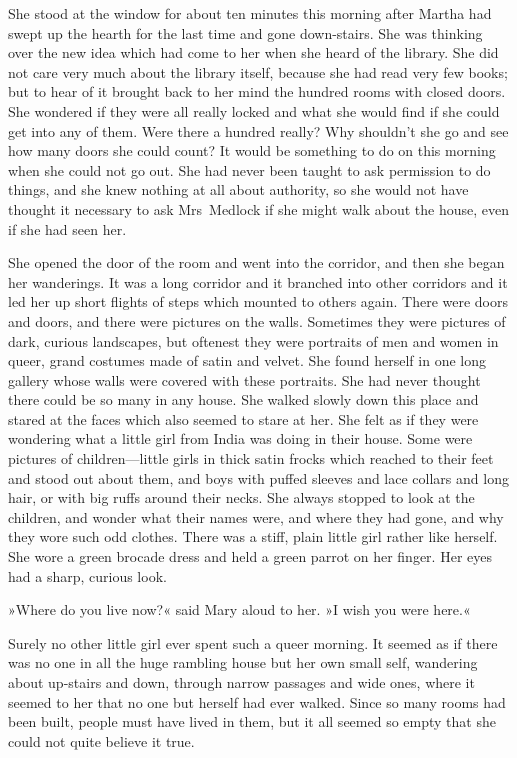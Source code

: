 She stood at the window for about ten minutes this morning after Martha had swept up the hearth for the last time and gone down-stairs. She was thinking over the new idea which had come to her when she heard of the library. She did not care very much about the library itself, because she had read very few books; but to hear of it brought back to her mind the hundred rooms with closed doors. She wondered if they were all really locked and what she would find if she could get into any of them. Were there a hundred really? Why shouldn't she go and see how many doors she could count? It would be something to do on this morning when she could not go out. She had never been taught to ask permission to do things, and she knew nothing at all about authority, so she would not have thought it necessary to ask Mrs~Medlock if she might walk about the house, even if she had seen her.

She opened the door of the room and went into the corridor, and then she began her wanderings. It was a long corridor and it branched into other corridors and it led her up short flights of steps which mounted to others again. There were doors and doors, and there were pictures on the walls. Sometimes they were pictures of dark, curious landscapes, but oftenest they were portraits of men and women in queer, grand costumes made of satin and velvet. She found herself in one long gallery whose walls were covered with these portraits. She had never thought there could be so many in any house. She walked slowly down this place and stared at the faces which also seemed to stare at her. She felt as if they were wondering what a little girl from India was doing in their house. Some were pictures of children—little girls in thick satin frocks which reached to their feet and stood out about them, and boys with puffed sleeves and lace collars and long hair, or with big ruffs around their necks. She always stopped to look at the children, and wonder what their names were, and where they had gone, and why they wore such odd clothes. There was a stiff, plain little girl rather like herself. She wore a green brocade dress and held a green parrot on her finger. Her eyes had a sharp, curious look.

»Where do you live now?« said Mary aloud to her. »I wish you were here.«

Surely no other little girl ever spent such a queer morning. It seemed as if there was no one in all the huge rambling house but her own small self, wandering about up-stairs and down, through narrow passages and wide ones, where it seemed to her that no one but herself had ever walked. Since so many rooms had been built, people must have lived in them, but it all seemed so empty that she could not quite believe it true.

